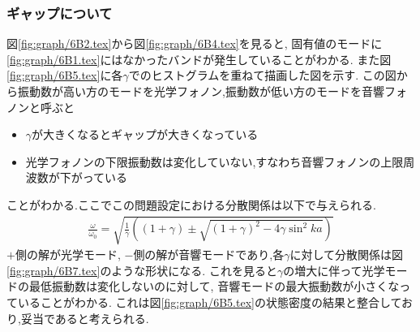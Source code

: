 \subsubsection{ギャップについて}
図\ref{fig:graph/6B2.tex}から図\ref{fig:graph/6B4.tex}を見ると,
固有値のモードに\ref{fig:graph/6B1.tex}にはなかったバンドが発生していることがわかる.
また図\ref{fig:graph/6B5.tex}に各$\gamma$でのヒストグラムを重ねて描画した図を示す.
この図から振動数が高い方のモードを光学フォノン,振動数が低い方のモードを音響フォノンと呼ぶと
\begin{itemize}
  \item $\gamma$が大きくなるとギャップが大きくなっている
  \item 光学フォノンの下限振動数は変化していない,すなわち音響フォノンの上限周波数が下がっている
\end{itemize}
ことがわかる.ここでこの問題設定における分散関係は以下で与えられる.
\begin{align}
  \frac{\omega}{\omega_0}=\sqrt{\frac{1}{\gamma}\left((1+\gamma)\pm\sqrt{(1+\gamma)^2-4\gamma\sin^2 ka}\right)}
\end{align}
$+$側の解が光学モード,
$-$側の解が音響モードであり,各$\gamma$に対して分散関係は図\ref{fig:graph/6B7.tex}のような形状になる.
これを見ると$\gamma$の増大に伴って光学モードの最低振動数は変化しないのに対して,
音響モードの最大振動数が小さくなっていることがわかる.
これは図\ref{fig:graph/6B5.tex}の状態密度の結果と整合しており,妥当であると考えられる.

